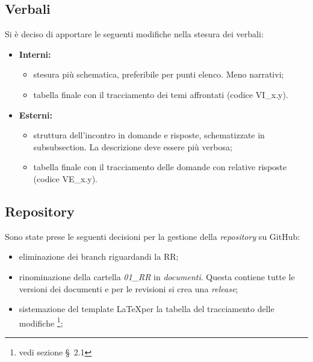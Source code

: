 \subsection{Verbali}
Si è deciso di apportare le seguenti modifiche nella stesura dei verbali:
\begin{itemize}
	\item \textbf{Interni:}
	\begin{itemize}
		\item stesura più schematica, preferibile per punti elenco. Meno narrativi;
		\item tabella finale con il tracciamento dei temi affrontati (codice VI\_x.y).
	\end{itemize}
	\item \textbf{Esterni:} 
	\begin{itemize}
		\item struttura dell'incontro in domande e risposte, schematizzate in subsubsection. La descrizione deve essere più verbosa;
		\item tabella finale con il tracciamento delle domande con relative risposte (codice VE\_x.y).
	\end{itemize}
\end{itemize}

\subsection{Repository}
Sono state prese le seguenti decisioni per la gestione della \textit{repository} su GitHub:
\begin{itemize}
	\item eliminazione dei branch riguardandi la RR;
	\item rinominazione della cartella \textit{01\_RR} in \textit{documenti}. Questa contiene tutte le versioni dei documenti e per le revisioni si crea una \textit{release};
	\item sistemazione del template \LaTeX per la tabella del tracciamento delle modifiche \footnote{vedi sezione \S\ 2.1};
\end{itemize}
